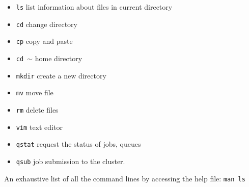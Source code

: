 \begin{itemize}
\item \texttt{ls} list information about files in current directory
\item \texttt{cd} change directory
\item \texttt{cp} copy and paste
\item \texttt{cd $\sim$} home directory
\item \texttt{mkdir} create a new directory
\item \texttt{mv} move file
\item \texttt{rm} delete files
\item \texttt{vim} text editor
\item \texttt{qstat} request the status of jobs, queues
\item \texttt{qsub}  job submission to the cluster.
\end{itemize}
An exhaustive list of all the command lines by accessing the help file: \texttt{man ls}

